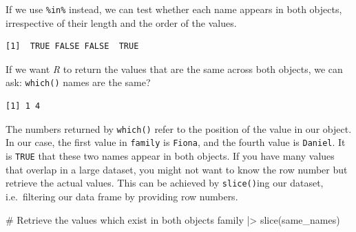\documentclass[
  letterpaper,
  DIV=11,
  numbers=noendperiod]{scrreprt}
\newenvironment{Shaded}{\begin{snugshade}}{\end{snugshade}}
\newcommand{\CommentTok}[1]{\textcolor[rgb]{0.37,0.37,0.37}{#1}}
\newcommand{\FunctionTok}[1]{\textcolor[rgb]{0.28,0.35,0.67}{#1}}
\newcommand{\NormalTok}[1]{\textcolor[rgb]{0.00,0.23,0.31}{#1}}
\newcommand{\OtherTok}[1]{\textcolor[rgb]{0.00,0.23,0.31}{#1}}
\newcommand{\SpecialCharTok}[1]{\textcolor[rgb]{0.37,0.37,0.37}{#1}}
\begin{document}
If we use \texttt{\%in\%} instead, we can test whether each name appears
in both objects, irrespective of their length and the order of the
values.

\begin{Shaded}
\end{Shaded}

\begin{verbatim}
[1]  TRUE FALSE FALSE  TRUE
\end{verbatim}

If we want \emph{R} to return the values that are the same across both
objects, we can ask: \texttt{which()} names are the same?

\begin{Shaded}
\end{Shaded}

\begin{verbatim}
[1] 1 4
\end{verbatim}

The numbers returned by \texttt{which()} refer to the position of the
value in our object. In our case, the first value in \texttt{family} is
\texttt{Fiona}, and the fourth value is \texttt{Daniel}. It is
\texttt{TRUE} that these two names appear in both objects. If you have
many values that overlap in a large dataset, you might not want to know
the row number but retrieve the actual values. This can be achieved by
\texttt{slice()}ing our dataset, i.e.~filtering our data frame by
providing row numbers.

\begin{Shaded}
\begin{Highlighting}[]
\CommentTok{\# Retrieve the values which exist in both objects}
\NormalTok{family }\SpecialCharTok{|\textgreater{}}
  \FunctionTok{slice}\NormalTok{(same\_names)}
\end{Highlighting}
\end{Shaded}
\end{document}
